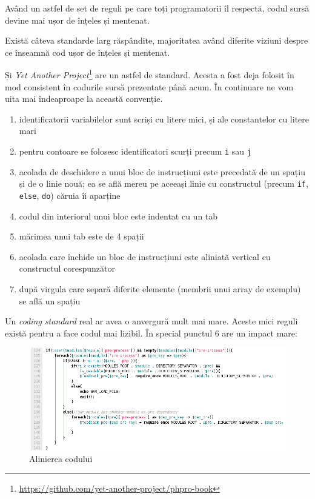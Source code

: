 Având un astfel de set de reguli pe care toți programatorii îl respectă, codul
sursă devine mai ușor de înțeles și mentenat.

Există câteva standarde larg răspândite, majoritatea având diferite viziuni
despre ce înseamnă {\glqq}cod ușor de înțeles și mentenat{\grqq}.

Și \textit{Yet Another Project}\footnote{\url{https://github.com/yet-another-project/phpro-book}}
are un astfel de standard. Acesta a fost deja folosit în mod consistent în codurile
sursă prezentate până acum. În continuare ne vom uita mai îndeaproape la această
convenție.

\begin{enumerate}
\item identificatorii variabilelor sunt scriși cu litere mici, și ale constantelor cu litere mari
\item pentru contoare se folosesc identificatori scurți precum \texttt{i} sau \texttt{j}
\item acolada de deschidere a unui bloc de instrucțiuni este precedată de un spațiu și de o linie nouă;
ea se află mereu pe aceeași linie cu constructul (precum \texttt{if}, \texttt{else}, \texttt{do}) căruia îi aparține
\item codul din interiorul unui bloc este indentat cu un tab
\item mărimea unui tab este de 4 spații
\item acolada care închide un bloc de instrucțiuni este aliniată vertical cu constructul corespunzător
\item după virgula care separă diferite elemente (membrii unui array de exemplu) se află un spațiu
\end{enumerate}

Un \textit{coding standard} real ar avea o anvergură mult mai mare. Aceste mici reguli există pentru
a face codul mai lizibil. În special punctul 6 are un impact mare:

\begin{figure}[ht!]
  \centering
    \includegraphics[scale=.5]{cap02/code_align.png}
  \caption{Alinierea codului}
  \label{fig:code_align}
\end{figure}

